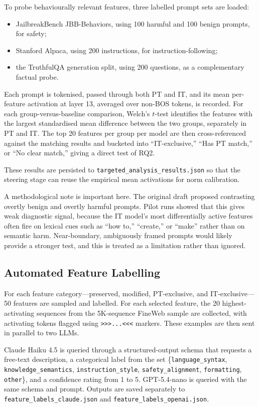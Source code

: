 To probe behaviourally relevant features, three labelled prompt sets are loaded:
\begin{itemize}
    \item JailbreakBench JBB-Behaviors, using 100 harmful and 100 benign prompts, for safety;
    \item Stanford Alpaca, using 200 instructions, for instruction-following;
    \item the TruthfulQA generation split, using 200 questions, as a complementary factual probe.
\end{itemize}

Each prompt is tokenised, passed through both PT and IT, and its mean per-feature activation at layer 13, averaged over non-BOS tokens, is recorded. For each group-versus-baseline comparison, Welch's $t$-test identifies the features with the largest standardised mean difference between the two groups, separately in PT and IT. The top 20 features per group per model are then cross-referenced against the matching results and bucketed into ``IT-exclusive,'' ``Has PT match,'' or ``No clear match,'' giving a direct test of RQ2.

These results are persisted to \texttt{targeted\_analysis\_results.json} so that the steering stage can reuse the empirical mean activations for norm calibration.

A methodological note is important here. The original draft proposed contrasting overtly benign and overtly harmful prompts. Pilot runs showed that this gives weak diagnostic signal, because the IT model's most differentially active features often fire on lexical cues such as ``how to,'' ``create,'' or ``make'' rather than on semantic harm. Near-boundary, ambiguously framed prompts would likely provide a stronger test, and this is treated as a limitation rather than ignored.

\subsection{Automated Feature Labelling}
\label{subsec:feature-labelling}

For each feature category---preserved, modified, PT-exclusive, and IT-exclusive---50 features are sampled and labelled. For each selected feature, the 20 highest-activating sequences from the 5K-sequence FineWeb sample are collected, with activating tokens flagged using \texttt{>>>...<<<} markers. These examples are then sent in parallel to two LLMs.

Claude Haiku 4.5 is queried through a structured-output schema that requests a free-text description, a categorical label from the set \{\texttt{language\_syntax}, \texttt{knowledge\_semantics}, \texttt{instruction\_style}, \texttt{safety\_alignment}, \texttt{formatting}, \texttt{other}\}, and a confidence rating from 1 to 5. GPT-5.4-nano is queried with the same schema and prompt. Outputs are saved separately to \texttt{feature\_labels\_claude.json} and \texttt{feature\_labels\_openai.json}.

